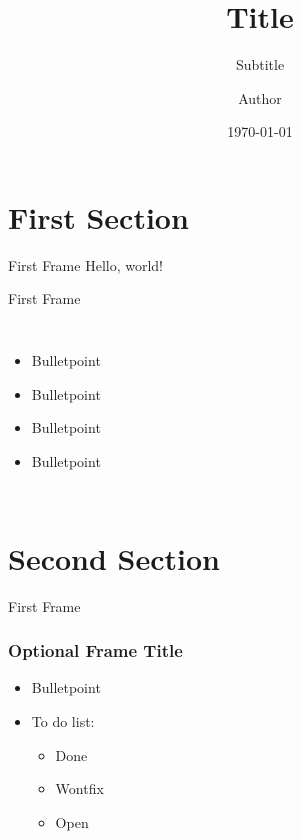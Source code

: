 
\usepackage{style/yildiz}

\title{Title}
\subtitle{Subtitle}
\date{\today}
\author{Author}






  \maketitle


  \section{First Section}
  \begin{frame}{First Frame}
    Hello, world!
  \end{frame}
  \begin{frame}{First Frame}
    \vskip5mm
 \begin{columns}
    \column{6cm}
     \column{5cm}
      \vspace{-4cm}
	\begin{itemize}
		 \itemsep1.2em
      	 \item Bulletpoint
      	 \item Bulletpoint
       	 \item Bulletpoint
     	 \item Bulletpoint
     \end{itemize}
 \end{columns}
  \end{frame}


 \section{Second Section}
  \begin{frame}{First Frame}
    \frametitle{Optional Frame Title} %
	\vskip5mm
	\vspace{-0.4cm} %
	\begin{itemize}
		\itemsep1.2em
		\item Bulletpoint
		\item To do list:
		\begin{itemize}
			\itemsep1.2em
			\item[\done] Done\cite{4351913}
			\item[\wontfix] Wontfix
			\item[\open] Open
		\end{itemize}
	\end{itemize}
  \end{frame}




